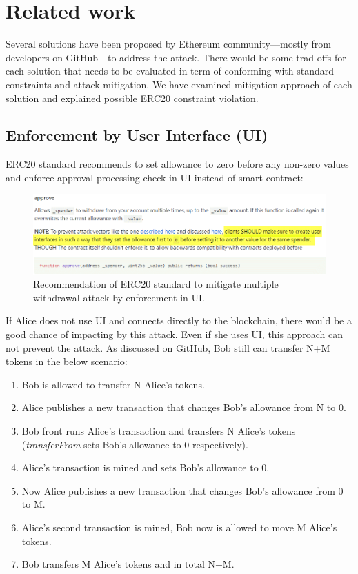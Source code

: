 
\newpage
\section{Related work}
Several solutions have been proposed by Ethereum community---mostly from developers on GitHub\cite{Ref07}---to address the attack. There would be some trad-offs for each solution that needs to be evaluated in term of conforming with standard constraints and attack mitigation. We have examined mitigation approach of each solution and explained possible ERC20 constraint violation.

\subsection{Enforcement by User Interface (UI)}
ERC20 standard recommends to set allowance to zero before any non-zero values and enforce approval processing check in UI instead of smart contract:
\begin{figure}[H]
	\centering
	\includegraphics[width=1.0\linewidth]{figures/multiple_withdrawal_03.png}
	\caption{Recommendation of ERC20 standard to mitigate multiple withdrawal attack by enforcement in UI.}
\end{figure}
\noindent If Alice does not use UI and connects directly to the blockchain, there would be a good chance of impacting by this attack. Even if she uses UI, this approach can not prevent the attack. As discussed on GitHub\cite{Ref14}, Bob still can transfer N+M tokens in the below scenario:
\begin{enumerate}
	\item Bob is allowed to transfer N Alice’s tokens.
	\item Alice publishes a new transaction that changes Bob’s allowance from N to 0.
	\item Bob front runs Alice’s transaction and transfers N Alice’s tokens (\textit{transferFrom} sets Bob’s allowance to 0 respectively).
	\item Alice’s transaction is mined and sets Bob’s allowance to 0.
	\item Now Alice publishes a new transaction that changes Bob’s allowance from 0 to M.
	\item Alice’s second transaction is mined, Bob now is allowed to move M Alice’s tokens.
	\item Bob transfers M Alice’s tokens and in total N+M.\newline
\end{enumerate}
